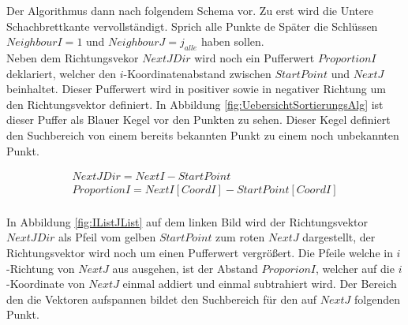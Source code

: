 Der Algorithmus dann nach folgendem Schema vor. Zu erst wird die Untere Schachbrettkante vervollständigt. Sprich alle Punkte de Später die Schlüssen $NeighbourI = 1$ und $NeighbourJ = j_{alle}$ haben sollen.\\


Neben dem Richtungsvekor $NextJDir$ wird noch ein Pufferwert $ProportionI$ deklariert, welcher den $i$-Koordinatenabstand zwischen $StartPoint$ und $NextJ$ beinhaltet. Dieser Pufferwert wird in positiver sowie in negativer Richtung um den Richtungsvektor definiert. In Abbildung \ref{fig:UebersichtSortierungsAlg} ist dieser Puffer als Blauer Kegel vor den Punkten zu sehen. Dieser Kegel definiert den Suchbereich von einem bereits bekannten Punkt zu einem noch unbekannten Punkt.

%
% 

\begin{gather*}
	NextJDir = NextI - StartPoint\\
	ProportionI = NextI[CoordI]-StartPoint[CoordI]
\end{gather*}\\

In Abbildung \ref{fig:IListJList} auf dem linken Bild wird der Richtungsvektor $NextJDir$ als Pfeil vom gelben $StartPoint$ zum roten $NextJ$ dargestellt, der Richtungsvektor wird noch um einen Pufferwert vergrößert. Die Pfeile welche in $i$-Richtung von $NextJ$ aus ausgehen, ist der Abstand $ProporionI$, welcher auf die $i$-Koordinate von $NextJ$ einmal addiert und einmal subtrahiert wird. Der Bereich den die Vektoren aufspannen bildet den Suchbereich für den auf $NextJ$ folgenden Punkt.\\


